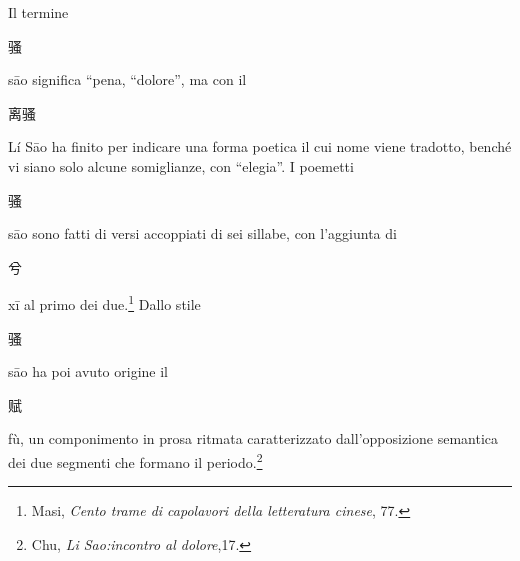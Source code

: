 \documentclass[12pt,titlepage]{article}
\begin{document}
Il termine 
\begin{CJK*}{UTF8}{gbsn}骚 \end{CJK*}sāo significa “pena, “dolore”, ma con il  
\begin{CJK*}{UTF8}{gbsn}离骚 \end{CJK*}Lí Sāo ha finito per indicare una forma poetica il cui nome viene tradotto, benché vi siano solo alcune somiglianze, con “elegia”. I poemetti 
\begin{CJK*}{UTF8}{gbsn}骚 \end{CJK*}sāo sono fatti di versi accoppiati di sei sillabe, con l'aggiunta di 
\begin{CJK*}{UTF8}{gbsn}兮 \end{CJK*}xī al primo dei due.\footnote{Masi, \emph{Cento trame di capolavori della letteratura cinese}, 77.} Dallo stile 
\begin{CJK*}{UTF8}{gbsn}骚 \end{CJK*}sāo ha poi avuto origine il 
\begin{CJK*}{UTF8}{gbsn}赋 \end{CJK*}fù, un componimento in prosa ritmata caratterizzato dall'opposizione semantica dei due segmenti che formano il periodo.\footnote{Chu, \emph{Li Sao:incontro al dolore},17.}
\end{document}
